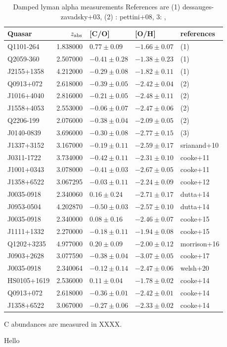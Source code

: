 \documentclass[11pt]{article}
\begin{document}
\begin{table}
\centering
\caption{
Damped lyman alpha measurements
References are (1) dessauges-zavadsky+03, (2) : pettini+08, 3: \citet{ellison+10}, }
\begin{tabular}{lrlll}
    \hline
    Quasar & $z_{\rm abs}$ & [C/O] & [O/H] & references \\
    \hline
    Q1101-264 & 1.838000 & $0.77 \pm 0.09$ & $-1.66 \pm 0.07$ & (1) \\
    Q2059-360 & 2.507000 & $-0.41 \pm 0.28$ & $-1.38 \pm 0.23$ & (1) \\
    J2155+1358 & 4.212000 & $-0.29 \pm 0.08$ & $-1.82 \pm 0.11$ & (1) \\
    Q0913+072 & 2.618000 & $-0.39 \pm 0.05$ & $-2.42 \pm 0.04$ & (2)\\
    J1016+4040 & 2.816000 & $-0.21 \pm 0.05$ & $-2.48 \pm 0.11$ & (2)\\
    J1558+4053 & 2.553000 & $-0.06 \pm 0.07$ & $-2.47 \pm 0.06$ & (2)\\
    Q2206-199 & 2.076000 & $-0.38 \pm 0.04$ & $-2.09 \pm 0.05$ & (2)\\
    J0140-0839 & 3.696000 & $-0.30 \pm 0.08$ & $-2.77 \pm 0.15$ & (3) \\
    J1337+3152 & 3.167000 & $-0.19 \pm 0.11$ & $-2.59 \pm 0.17$ & srianand+10 \\
    J0311-1722 & 3.734000 & $-0.42 \pm 0.11$ & $-2.31 \pm 0.10$ & cooke+11 \\
    J1001+0343 & 3.078000 & $-0.41 \pm 0.03$ & $-2.67 \pm 0.05$ & cooke+11 \\
    J1358+6522 & 3.067295 & $-0.03 \pm 0.11$ & $-2.24 \pm 0.09$ & cooke+12 \\
    J0035-0918 & 2.340060 & $0.16 \pm 0.24$ & $-2.71 \pm 0.17$ & dutta+14 \\
    J0953-0504 & 4.202870 & $-0.50 \pm 0.03$ & $-2.57 \pm 0.10$ & dutta+14 \\
    J0035-0918 & 2.340000 & $0.08 \pm 0.16$ & $-2.46 \pm 0.07$ & cooke+15 \\
    J1111+1332 & 2.270000 & $-0.18 \pm 0.11$ & $-1.94 \pm 0.08$ & cooke+15 \\
    Q1202+3235 & 4.977000 & $0.20 \pm 0.09$ & $-2.00 \pm 0.12$ & morrison+16 \\
    J0903+2628 & 3.077590 & $-0.38 \pm 0.04$ & $-3.07 \pm 0.05$ & cooke+17 \\
    J0035-0918 & 2.340064 & $-0.12 \pm 0.14$ & $-2.47 \pm 0.06$ & welsh+20 \\
    HS0105+1619 & 2.536000 & $0.11 \pm 0.04$ & $-1.78 \pm 0.02$ & cooke+14 \\
    Q0913+072 & 2.618000 & $-0.36 \pm 0.01$ & $-2.42 \pm 0.01$ & cooke+14 \\
    J1358+6522 & 3.067000 & $-0.27 \pm 0.06$ & $-2.33 \pm 0.02$ & cooke+14 \\
    \hline
\end{tabular}
\end{table}

C abundances are measured in XXXX.

Hello


\newpage



\end{document}
